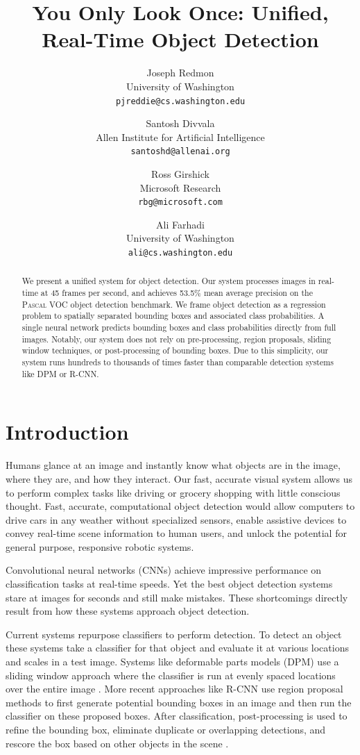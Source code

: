 \documentclass{article} %
\title{You Only Look Once: Unified, Real-Time Object Detection}
\author{Joseph Redmon\\
University of Washington\\
\texttt{pjreddie@cs.washington.edu}
\and
Santosh Divvala\\
Allen Institute for Artificial Intelligence\\
\texttt{santoshd@allenai.org}
\and
Ross Girshick\\
Microsoft Research\\
\texttt{rbg@microsoft.com}
\and
Ali Farhadi\\
University of Washington\\
\texttt{ali@cs.washington.edu}
}
\begin{document}
\maketitle

\begin{abstract}
We present a unified system for object detection. Our system processes images in real-time at 45 frames per second, and achieves 53.5\% mean average precision on the \textsc{Pascal} VOC object detection benchmark. We frame object detection as a regression problem to spatially separated bounding boxes and associated class probabilities. A single neural network predicts bounding boxes and class probabilities directly from full images. Notably, our system does not rely on pre-processing, region proposals, sliding window techniques, or post-processing of bounding boxes. Due to this simplicity, our system runs hundreds to thousands of times faster than comparable detection systems like DPM or R-CNN.
\end{abstract}

\section{Introduction}

Humans glance at an image and instantly know what objects are in the image, where they are, and how they interact. Our fast, accurate visual system allows us to perform complex tasks like driving or grocery shopping with little conscious thought. Fast, accurate, computational object detection would allow computers to drive cars in any weather without specialized sensors, enable assistive devices to convey real-time scene information to human users, and unlock the potential for general purpose, responsive robotic systems.

Convolutional neural networks (CNNs) achieve impressive performance on classification tasks at real-time speeds. Yet the best object detection systems stare at images for seconds and still make mistakes. These shortcomings directly result from how these systems approach object detection.

Current systems repurpose classifiers to perform detection. To detect an object these systems take a classifier for that object and evaluate it at various locations and scales in a test image. Systems like deformable parts models (DPM) use a sliding window approach where the classifier is run at evenly spaced locations over the entire image \cite{lsvm-pami}. More recent approaches like R-CNN use region proposal methods to first generate potential bounding boxes in an image and then run the classifier on these proposed boxes. After classification, post-processing is used to refine the bounding box, eliminate duplicate or overlapping detections, and rescore the box based on other objects in the scene \cite{girshick2014rich}.
\end{document}
